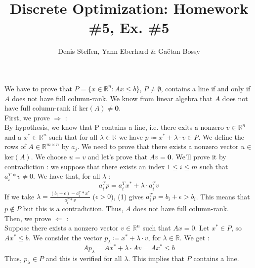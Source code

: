 \documentclass[a4paper,11pt,french]{article}
\title{Discrete Optimization: Homework \#5, Ex. \#5}
\author{Denis Steffen, Yann Eberhard \& Gaëtan Bossy}
\begin{document}
    
    \maketitle
    
    We have to prove that $P = \{ x \in \mathbb{R}^n : Ax \leq b\}$, $P \not = \emptyset $, contains a line if and only if $A$ does not have full column-rank.
    We know from linear algebra that $A$ does not have full column-rank if ker$(A) \not = \mathbf {0}$. 
\\

    First, we prove  $\Rightarrow$ : \\
    By hypothesis, we know that P contains a line, i.e. there exits a nonzero $v \in \mathbb{R}^n$ and a $x^* \in \mathbb{R}^n$ such that for all $\lambda \in \mathbb{R}$ we have $ p \coloneqq x^* + \lambda \cdot v \in P$. 
    We define the rows of $A \in \mathbb{R}^{m \times n}$ by $a_j$.
    We need to prove that there exists a nonzero vector $u \in$ ker$(A)$. We choose $u = v$ and let's prove that $Av = \mathbf 0$.  
    We'll prove it by contradiction : we suppose that there exists an index $1 \leq i \leq m$ such that $a_i^T*v \not = 0$. We have that, for all $\lambda$ : 
    \begin{equation}
        a_i^Tp = a_i^Tx^* + \lambda \cdot a_i^Tv
    \end{equation}
    If we take  $\lambda = \frac{(b_i + \epsilon) - a_i^T*x^*}{a_i^T*v} $ ($\epsilon > 0$), (1) gives $a_i^Tp = b_i + \epsilon > b_i$. 
    This means that $p \not \in P$ but this is a contradiction. Thus, $A$ does not have full column-rank.
    \\ 

    Then, we prove $\Leftarrow$ : 
    \\ Suppose there exists a nonzero vector $v \in \mathbb{R}^n$ such that $Ax = 0$. 
    Let $x^* \in P$, so $Ax^* \leq b$. We consider the vector $p_\lambda \coloneqq x^* + \lambda \cdot v$, for $\lambda \in \mathbb{R}$. 
    We get : 
    \begin{equation*}
        Ap_\lambda = Ax^* + \lambda \cdot Av = Ax^* \leq b
    \end{equation*}
    Thus, $p_\lambda \in P$ and this is verified for all $\lambda$. This implies that $P$ contains a line.

    
    
\end{document}
